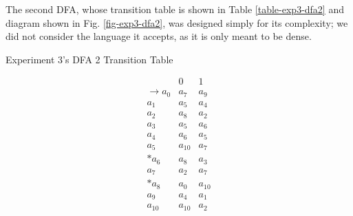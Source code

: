 \documentclass[conference]{IEEEtran}
\begin{document}
The second DFA, whose transition table is shown in Table \ref{table-exp3-dfa2} and diagram shown in Fig. \ref{fig-exp3-dfa2}, was designed simply for its complexity; we did not consider the language it accepts, as it is only meant to be dense.

\begin{table}[h!]
    \caption{Experiment 3's DFA 2 Transition Table}
    \begin{displaymath}
        \begin{array}{r|c|c|}
        & 0 & 1 \\
        \hline
        \rightarrow a_0 & a_7 & a_9 \\
        a_1 & a_5 & a_4 \\
        a_2 & a_8 & a_2 \\
        a_3 & a_5 & a_6 \\
        a_4 & a_6 & a_5 \\
        a_5 & a_{10} & a_7 \\
        * a_6 & a_8 & a_3 \\
        a_7 & a_2 & a_7 \\
        * a_8 & a_0 & a_{10} \\
        a_9 & a_4 & a_1 \\
        a_{10} & a_{10} & a_2 \\
        \end{array}
    \end{displaymath}
    \label{table-exp3-dfa2}
\end{table}
\end{document}
